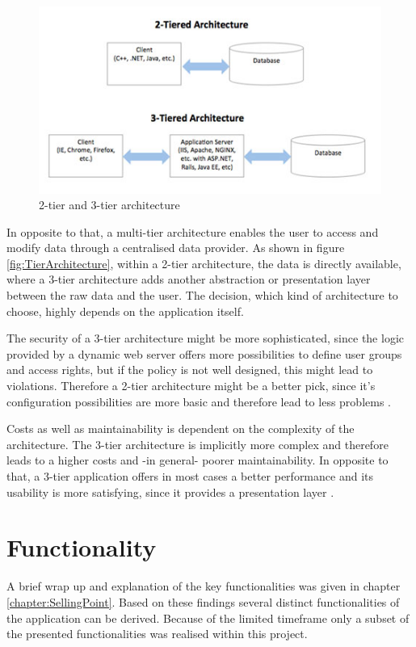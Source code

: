 \begin{figure}[h]
  	\centering
  	\includegraphics[width=0.7\linewidth]{./images/tier-architecture.jpg}
  	\caption[2-tier and 3-tier architecture, retrieved from \cite{Wright:2015aa}]{2-tier and 3-tier architecture}
	\label{fig:TierArchitecture}
\end{figure}
\nocite{Wright:2015aa}

In opposite to that, a multi-tier architecture enables the user to access and modify data through a centralised data provider. As shown in figure \vref{fig:TierArchitecture}, within a 2-tier architecture, the data is directly available, where a 3-tier architecture adds another abstraction or presentation layer between the raw data and the user. The decision, which kind of architecture to choose, highly depends on the application itself. 

The security of a 3-tier architecture might be more sophisticated, since the logic provided by a dynamic web server offers more possibilities to define user groups and access rights, but if the policy is not well designed, this might lead to violations. Therefore a 2-tier architecture might be a better pick, since it's configuration possibilities are more basic and therefore lead to less problems \cite{Wright:2015aa}.

Costs as well as maintainability is dependent on the complexity of the architecture. The 3-tier architecture is implicitly more complex and therefore leads to a higher costs and -in general- poorer maintainability. In opposite to that, a 3-tier application offers in most cases a better performance and its usability is more satisfying, since it provides a presentation layer \cite{Wright:2015aa}.

\section{Functionality} %

A brief wrap up and explanation of the key functionalities was given in chapter \vref{chapter:SellingPoint}. Based on these findings several distinct functionalities of the application can be derived. Because of the limited timeframe only a subset of the presented functionalities was realised within this project.

